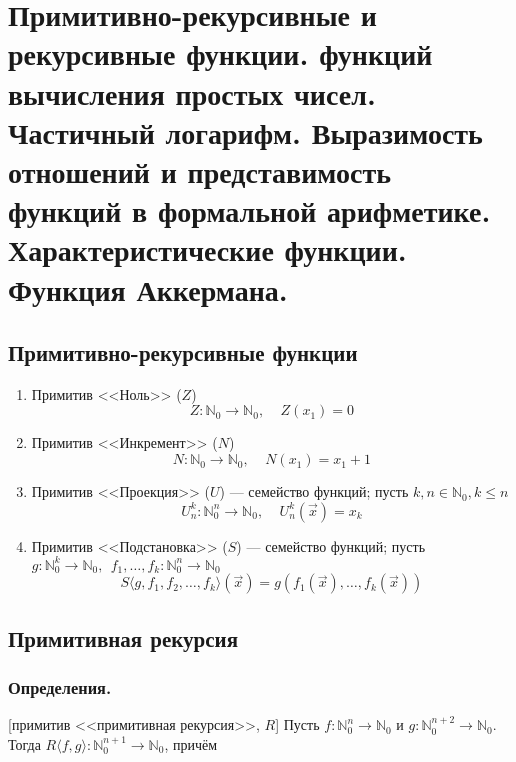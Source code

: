 \documentclass[10pt,a4paper,oneside]{article}
\begin{document}
\section{Примитивно-рекурсивные и рекурсивные функции. 
функций вычисления простых чисел. Частичный логарифм.
Выразимость отношений и представимость функций в формальной арифметике. Характеристические функции.
Функция Аккермана.}

\subsection{Примитивно-рекурсивные функции}

\begin{enumerate}
\item Примитив <<Ноль>> ($Z$) \vspace{-0.3cm}
$$Z: \mathbb{N}_0\to\mathbb{N}_0,\ \ \ \ \ Z(x_1) = 0$$\vspace{-0.5cm}
\item Примитив <<Инкремент>> ($N$) \vspace{-0.3cm}
$$N: \mathbb{N}_0\to\mathbb{N}_0,\ \ \ \ \ N(x_1) = x_1+1$$\vspace{-0.5cm}
\item Примитив <<Проекция>> ($U$) — семейство функций; пусть $k,n \in \mathbb{N}_0, k \le n$\vspace{-0.2cm}
$$U^k_n: \mathbb{N}^n_0 \to \mathbb{N}_0,\ \ \ \ \ U^k_n(\overrightarrow{x}) = x_k$$\vspace{-0.5cm}
\item Примитив <<Подстановка>> ($S$) --- семейство функций; пусть $g: \mathbb{N}^k_0 \to \mathbb{N}_0,\ \ f_1,\dots,f_k: \mathbb{N}^n_0 \to \mathbb{N}_0$
$$S\langle g,f_1,f_2,\dots,f_k \rangle (\overrightarrow{x}) = g(f_1(\overrightarrow{x}),\dots,f_k(\overrightarrow{x}))$$
\end{enumerate}

\subsection{Примитивная рекурсия}
\subsubsection{Определения.}
 [примитив <<примитивная рекурсия>>, $R$]
Пусть $f: \mathbb{N}^n_0\to\mathbb{N}_0$ и $g: \mathbb{N}^{n+2}_0 \to\mathbb{N}_0$.
Тогда $R\langle f,g\rangle: \mathbb{N}^{n+1}_0\to\mathbb{N}_0$, причём
\end{document}
